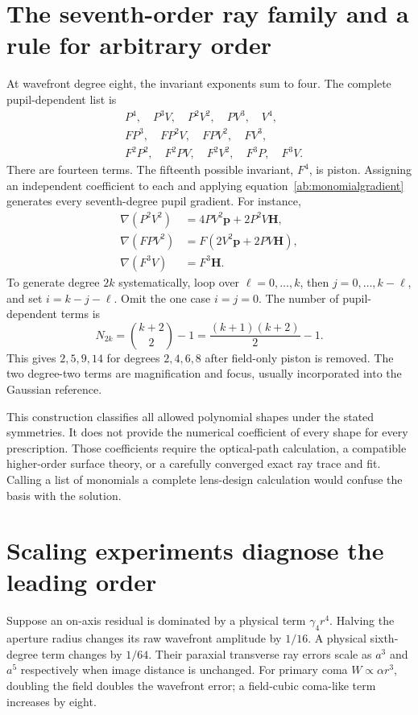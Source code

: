 \section{The seventh-order ray family and a rule for arbitrary order}
At wavefront degree eight, the invariant exponents sum to four. The complete
pupil-dependent list is
\begin{align}
 &P^4,\quad P^3V,\quad P^2V^2,\quad PV^3,\quad V^4,\nonumber\\
 &FP^3,\quad FP^2V,\quad FPV^2,\quad FV^3,\nonumber\\
 &F^2P^2,\quad F^2PV,\quad F^2V^2,\quad F^3P,\quad F^3V.
\end{align}
There are fourteen terms. The fifteenth possible invariant, $F^4$, is piston.
Assigning an independent coefficient to each and applying
equation~\eqref{ab:monomialgradient} generates every seventh-degree pupil
gradient. For instance,
\begin{align}
 \nabla(P^2V^2)&=4PV^2\bm p+2P^2V\bm H,\\
 \nabla(FPV^2)&=F(2V^2\bm p+2PV\bm H),\\
 \nabla(F^3V)&=F^3\bm H.
\end{align}
To generate degree $2k$ systematically, loop over
$\ell=0,\ldots,k$, then $j=0,\ldots,k-\ell$, and set
$i=k-j-\ell$. Omit the one case $i=j=0$. The number of pupil-dependent
terms is
\begin{equation}
 N_{2k}=\binom{k+2}{2}-1=\frac{(k+1)(k+2)}{2}-1.
\end{equation}
This gives $2,5,9,14$ for degrees $2,4,6,8$ after field-only piston is removed.
The two degree-two terms are magnification and focus, usually incorporated
into the Gaussian reference.

This construction classifies all allowed polynomial shapes under the stated
symmetries. It does not provide the numerical coefficient of every shape for
every prescription. Those coefficients require the optical-path calculation,
a compatible higher-order surface theory, or a carefully converged exact ray
trace and fit. Calling a list of monomials a complete lens-design calculation
would confuse the basis with the solution.

\section{Scaling experiments diagnose the leading order}
Suppose an on-axis residual is dominated by a physical term $\gamma_4r^4$.
Halving the aperture radius changes its raw wavefront amplitude by $1/16$.
A physical sixth-degree term changes by $1/64$. Their paraxial transverse ray
errors scale as $a^3$ and $a^5$ respectively when image distance is unchanged.
For primary coma $W\propto\alpha r^3$, doubling the field doubles the
wavefront error; a field-cubic coma-like term increases by eight.

